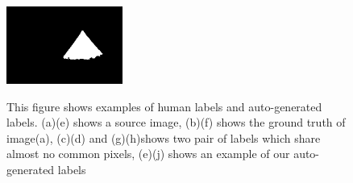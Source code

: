 \documentclass[runningheads,a4paper]{llncs}
\begin{document}
\begin{figure}[!tb]
{\includegraphics[width=0.15\columnwidth,height=1in]{images/188063-gt.png}
}

\caption{ This figure shows examples of human labels and auto-generated labels. (a)(e) shows a source image, (b)(f) shows the ground truth of image(a), (c)(d) and (g)(h)shows two pair of labels which share almost no common pixels, (e)(j) shows an example of our auto-generated labels }
\label{fig:example}
\end{figure}
\end{document}
